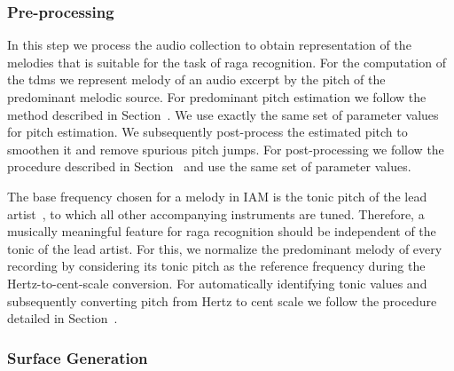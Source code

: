 \subsubsection{Pre-processing} 
\label{sec:tdms_preprocessing}

In this step we process the audio collection to obtain representation of the melodies that is suitable for the task of \gls{raga} recognition. For the computation of the \gls{tdms} we represent melody of an audio excerpt by the pitch of the predominant melodic source. For predominant pitch estimation we follow the method described in Section~. We use exactly the same set of parameter values for pitch estimation. We subsequently post-process the estimated pitch to smoothen it and remove spurious pitch jumps. For post-processing we follow the procedure described in Section~ and use the same set of parameter values.

The base frequency chosen for a melody in IAM is the tonic pitch of the lead artist~\cite{Gulati2014Tonic}, to which all other accompanying instruments are tuned. Therefore, a musically meaningful feature for \gls{raga} recognition should be independent of the tonic of the lead artist. For this, we normalize the predominant melody of every recording by considering its tonic pitch as the reference frequency during the Hertz-to-cent-scale conversion. For automatically identifying tonic values and subsequently converting pitch from Hertz to cent scale we follow the procedure detailed in Section~.


\subsubsection{Surface Generation}
\label{sec:tdms_surface_generation}

